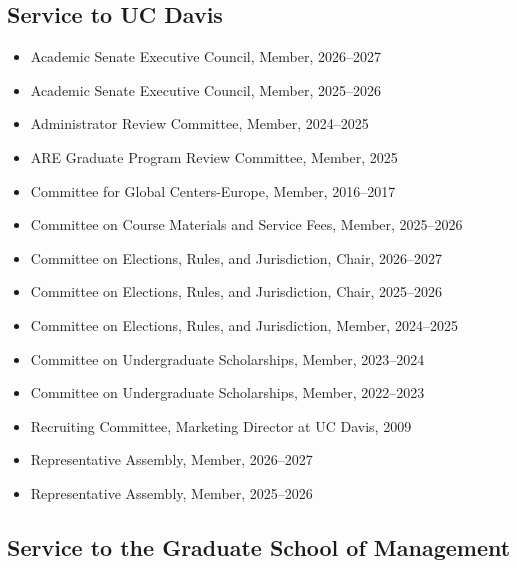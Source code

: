 \documentclass[10pt]{article}
\begin{document}
\subsection{Service to UC Davis}

 \begin{itemize}
\item[] Academic Senate Executive Council, Member, 2026--2027
\item[] Academic Senate Executive Council, Member, 2025--2026

\item[] Administrator Review Committee, Member, 2024--2025

\item[] ARE Graduate Program Review Committee, Member, 2025

\item[] Committee for Global Centers-Europe, Member, 2016--2017

\item[] Committee on Course Materials and Service Fees, Member, 2025--2026

\item[] Committee on Elections, Rules, and Jurisdiction, Chair, 2026--2027
\item[] Committee on Elections, Rules, and Jurisdiction, Chair, 2025--2026
\item[] Committee on Elections, Rules, and Jurisdiction, Member, 2024--2025

\item[] Committee on Undergraduate Scholarships, Member, 2023--2024
\item[] Committee on Undergraduate Scholarships, Member, 2022--2023

\item[] Recruiting Committee, Marketing Director at UC Davis, 2009

\item[] Representative Assembly, Member, 2026--2027
\item[] Representative Assembly, Member, 2025--2026
\end{itemize}

\subsection{Service to the Graduate School of Management}
\end{document}
